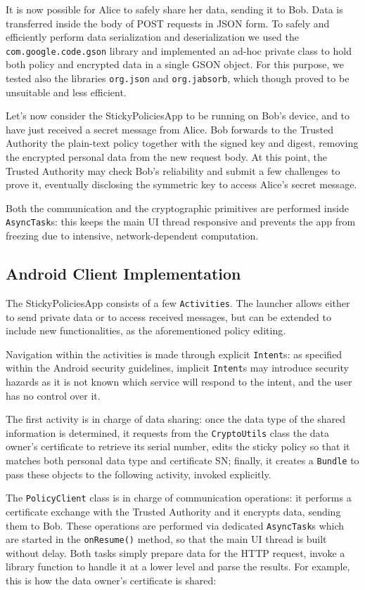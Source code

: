 It is now possible for Alice to safely share her data, sending it to Bob. Data is transferred inside the body of POST requests in JSON form. To safely and efficiently perform data serialization and deserialization we used the \texttt{com.google.code.gson} library and implemented an ad-hoc private class to hold both policy and encrypted data in a single GSON object. For this purpose, we tested also the libraries \texttt{org.json} and \texttt{org.jabsorb}, which though proved to be unsuitable and less efficient.

Let's now consider the StickyPoliciesApp to be running on Bob's device, and to have just received a secret message from Alice. Bob forwards to the Trusted Authority the plain-text policy together with the signed key and digest, removing the encrypted personal data from the new request body. At this point, the Trusted Authority may check Bob's reliability and submit a few challenges to prove it, eventually disclosing the symmetric key to access Alice's secret message.

Both the communication and the cryptographic primitives are performed inside \texttt{AsyncTask}s: this keeps the main UI thread responsive and prevents the app from freezing due to intensive, network-dependent computation.

\subsection{Android Client Implementation}
The StickyPoliciesApp consists of a few \texttt{Activities}. The launcher allows either to send private data or to access received messages, but can be extended to include new functionalities, as the aforementioned policy editing.

Navigation within the activities is made through explicit \texttt{Intent}s: as specified within the Android security guidelines, implicit \texttt{Intent}s may introduce security hazards as it is not known which service will respond to the intent, and the user has no control over it.

The first activity is in charge of data sharing: once the data type of the shared information is determined, it requests from the \texttt{CryptoUtils} class the data owner's certificate to retrieve its serial number, edits the sticky policy so that it matches both personal data type and certificate SN; finally, it creates a \texttt{Bundle} to pass these objects to the following activity, invoked explicitly.

The \texttt{PolicyClient} class is in charge of communication operations: it performs a certificate exchange with the Trusted Authority and it encrypts data, sending them to Bob. These operations are performed via dedicated \texttt{AsyncTask}s which are started in the \texttt{onResume()} method, so that the main UI thread is built without delay. Both tasks simply prepare data for the HTTP request, invoke a library function to handle it at a lower level and parse the results. For example, this is how the data owner's certificate is shared:


